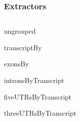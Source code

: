 \documentclass{beamer}
\begin{document}
\begin{frame}
\frametitle{Extractors}
\begin{column}{1\textwidth}
  \bit
      \item ungrouped
        \bit
            \item transcriptBy
            \item exonsBy
            \item intronsByTranscript
            \item fiveUTRsByTranscript
            \item threeUTRsByTranscript
        \eit
  \eit
\end{column}
\end{frame}
  
\end{document}
